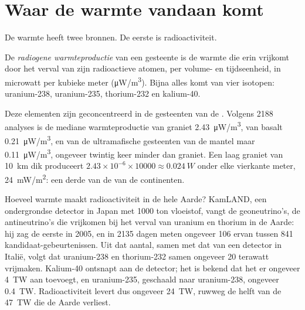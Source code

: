 \section{Waar de warmte vandaan komt}

De warmte heeft twee bronnen. De eerste is radioactiviteit.

\begin{definition}\label{def:g12:internal-heat:heat-production}
De \emph{radiogene warmteproductie} van
een gesteente is de warmte die erin vrijkomt door het verval van zijn radioactieve atomen,
per volume- en tijdseenheid, in microwatt per kubieke meter
(\unit{\micro W/m^3}). Bijna alles komt van vier isotopen: uranium-238,
uranium-235, thorium-232 en kalium-40.
\end{definition}

Deze elementen zijn geconcentreerd in de gesteenten van de . Volgens
2188 analyses is de mediane warmteproductie van graniet
\qty{2.43}{\micro W/m^3}, van basalt \qty{0.21}{\micro W/m^3}, en van de
ultramafische gesteenten van de mantel maar \qty{0.11}{\micro W/m^3}, ongeveer twintig
keer minder dan graniet. Een laag graniet van \qty{10}{km} dik produceert
$2.43 \times 10^{-6} \times \num{10000} \approx \qty{0.024}{W}$ onder elke
vierkante meter, \qty{24}{mW/m^2}: een derde van de  van de continenten.

Hoeveel warmte maakt radioactiviteit in de hele Aarde? KamLAND, een
ondergrondse detector in Japan met 1000 ton vloeistof, vangt de
geoneutrino's, de antineutrino's die vrijkomen bij het verval van uranium en thorium
in de Aarde: hij zag de eerste in 2005, en in 2135 dagen
meten ongeveer 106 ervan tussen 841 kandidaat-gebeurtenissen. Uit dat aantal,
samen met dat van een detector in Italië, volgt dat uranium-238 en thorium-232 samen
ongeveer 20 terawatt vrijmaken. Kalium-40 ontsnapt aan de detector; het is bekend
dat het er ongeveer \qty{4}{TW} aan toevoegt, en uranium-235, geschaald naar uranium-238, ongeveer
\qty{0.4}{TW}. Radioactiviteit levert dus ongeveer \qty{24}{TW},
ruwweg de helft van de \qty{47}{TW} die de Aarde verliest.

